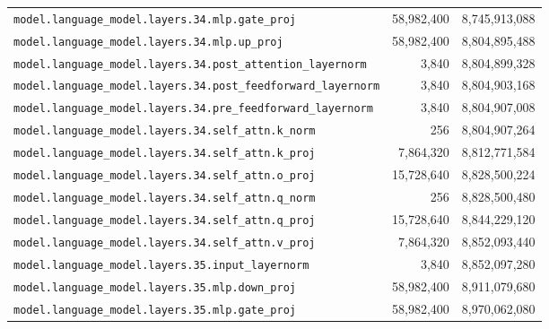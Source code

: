 \documentclass[10pt,a4paper]{article}
\theoremstyle{definition}
\begin{document}
\begin{appendices}
\begin{longtable}{p{9.5cm}rr}
\texttt{model.\allowbreak{}language\_model.\allowbreak{}layers.\allowbreak{}34.\allowbreak{}mlp.\allowbreak{}gate\_proj} & 58,982,400 & 8,745,913,088 \\
\texttt{model.\allowbreak{}language\_model.\allowbreak{}layers.\allowbreak{}34.\allowbreak{}mlp.\allowbreak{}up\_proj} & 58,982,400 & 8,804,895,488 \\
\texttt{model.\allowbreak{}language\_model.\allowbreak{}layers.\allowbreak{}34.\allowbreak{}post\_attention\_layernorm} & 3,840 & 8,804,899,328 \\
\texttt{model.\allowbreak{}language\_model.\allowbreak{}layers.\allowbreak{}34.\allowbreak{}post\_feedforward\_layernorm} & 3,840 & 8,804,903,168 \\
\texttt{model.\allowbreak{}language\_model.\allowbreak{}layers.\allowbreak{}34.\allowbreak{}pre\_feedforward\_layernorm} & 3,840 & 8,804,907,008 \\
\texttt{model.\allowbreak{}language\_model.\allowbreak{}layers.\allowbreak{}34.\allowbreak{}self\_attn.\allowbreak{}k\_norm} & 256 & 8,804,907,264 \\
\texttt{model.\allowbreak{}language\_model.\allowbreak{}layers.\allowbreak{}34.\allowbreak{}self\_attn.\allowbreak{}k\_proj} & 7,864,320 & 8,812,771,584 \\
\texttt{model.\allowbreak{}language\_model.\allowbreak{}layers.\allowbreak{}34.\allowbreak{}self\_attn.\allowbreak{}o\_proj} & 15,728,640 & 8,828,500,224 \\
\texttt{model.\allowbreak{}language\_model.\allowbreak{}layers.\allowbreak{}34.\allowbreak{}self\_attn.\allowbreak{}q\_norm} & 256 & 8,828,500,480 \\
\texttt{model.\allowbreak{}language\_model.\allowbreak{}layers.\allowbreak{}34.\allowbreak{}self\_attn.\allowbreak{}q\_proj} & 15,728,640 & 8,844,229,120 \\
\texttt{model.\allowbreak{}language\_model.\allowbreak{}layers.\allowbreak{}34.\allowbreak{}self\_attn.\allowbreak{}v\_proj} & 7,864,320 & 8,852,093,440 \\
\texttt{model.\allowbreak{}language\_model.\allowbreak{}layers.\allowbreak{}35.\allowbreak{}input\_layernorm} & 3,840 & 8,852,097,280 \\
\texttt{model.\allowbreak{}language\_model.\allowbreak{}layers.\allowbreak{}35.\allowbreak{}mlp.\allowbreak{}down\_proj} & 58,982,400 & 8,911,079,680 \\
\texttt{model.\allowbreak{}language\_model.\allowbreak{}layers.\allowbreak{}35.\allowbreak{}mlp.\allowbreak{}gate\_proj} & 58,982,400 & 8,970,062,080 \\

\end{longtable}
\end{appendices}
\end{document}
